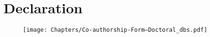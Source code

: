 
\chapter*{Declaration} %

\thispagestyle{empty}

\begin{figure}[!htbp]
    \centering
    \texttt{[image: Chapters/Co-authorship-Form---Doctoral\_dbs.pdf]}
\end{figure}